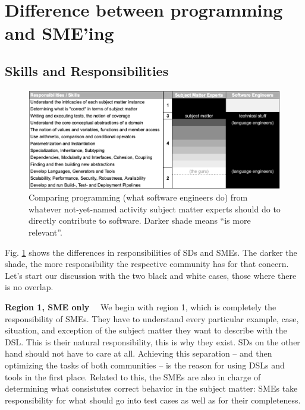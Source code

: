 \documentclass[runningheads]{llncs}
\newcommand\parhead[1]{\vspace{1mm}\noindent\textbf{{#1}}\ \ }
\newcommand{\fig}[1]{Fig. \ref{#1}}  %
\begin{document}
\section{Difference between programming and SME'ing}
\label{canTheyDoIt}




\subsection{Skills and Responsibilities}

\begin{figure}[t]
\begin{center}
    \includegraphics[width=1\columnwidth]{figures/table-respo.png}
    \caption{Comparing programming (what software engineers do) from
    whatever not-yet-named activity subject matter experts should do to 
    directly contribute to software. Darker shade means ``is more relevant''.}
    \label{table-respo}
\end{center} 
\end{figure} 

\fig{table-respo} shows the differences in responsibilities of SDs and SMEs. The
darker the shade, the more responsibility the respective community has for that
concern. Let's start our discussion with the two black and white cases, those
where there is no overlap.


\parhead{Region 1, SME only} We begin with region 1, which is completely the
responsibility of SMEs. They have to understand every particular example, case,
situation, and exception of the subject matter they want to describe with the DSL.
This is their natural responsibility, this is why they exist. SDs on the other
hand should not have to care at all. Achieving this separation -- and then
optimizing the tasks of both communities -- is the reason for using DSLs and
tools in the first place. Related to this, the SMEs are also in charge of
determining what consistutes correct behavior in the subject matter:
SMEs take responsibility for what should go into test cases as well as for their
completeness.
\end{document}
